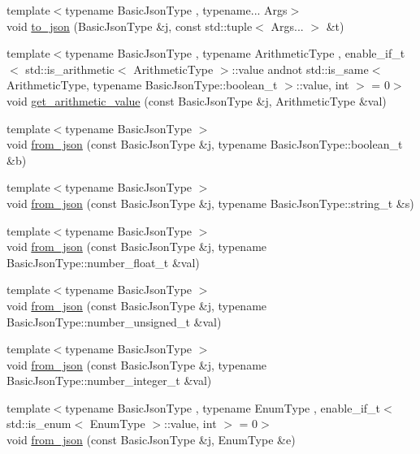 \begin{DoxyCompactItemize}
\item 
{\footnotesize template$<$typename Basic\+Json\+Type , typename... Args$>$ }\\void \hyperlink{namespacenlohmann_1_1detail_aa7a47b08eee864c2c108c04954919648}{to\+\_\+json} (Basic\+Json\+Type \&j, const std\+::tuple$<$ Args... $>$ \&t)
\item 
{\footnotesize template$<$typename Basic\+Json\+Type , typename Arithmetic\+Type , enable\+\_\+if\+\_\+t$<$ std\+::is\+\_\+arithmetic$<$ Arithmetic\+Type $>$\+::value andnot std\+::is\+\_\+same$<$ Arithmetic\+Type, typename Basic\+Json\+Type\+::boolean\+\_\+t $>$\+::value, int $>$  = 0$>$ }\\void \hyperlink{namespacenlohmann_1_1detail_a85955b9c6dd31846e4b8e891f78614b6}{get\+\_\+arithmetic\+\_\+value} (const Basic\+Json\+Type \&j, Arithmetic\+Type \&val)
\item 
{\footnotesize template$<$typename Basic\+Json\+Type $>$ }\\void \hyperlink{namespacenlohmann_1_1detail_a58117f225f43d03e3a0a4a6f3d77c9d9}{from\+\_\+json} (const Basic\+Json\+Type \&j, typename Basic\+Json\+Type\+::boolean\+\_\+t \&b)
\item 
{\footnotesize template$<$typename Basic\+Json\+Type $>$ }\\void \hyperlink{namespacenlohmann_1_1detail_ad74d89f77ada7a57eff38b43d4bf2335}{from\+\_\+json} (const Basic\+Json\+Type \&j, typename Basic\+Json\+Type\+::string\+\_\+t \&s)
\item 
{\footnotesize template$<$typename Basic\+Json\+Type $>$ }\\void \hyperlink{namespacenlohmann_1_1detail_a7cb5dd7d46a60e65f9a8e0873b3f7dd8}{from\+\_\+json} (const Basic\+Json\+Type \&j, typename Basic\+Json\+Type\+::number\+\_\+float\+\_\+t \&val)
\item 
{\footnotesize template$<$typename Basic\+Json\+Type $>$ }\\void \hyperlink{namespacenlohmann_1_1detail_ace4d5680ba413d9fd897ccb5d9c61a1c}{from\+\_\+json} (const Basic\+Json\+Type \&j, typename Basic\+Json\+Type\+::number\+\_\+unsigned\+\_\+t \&val)
\item 
{\footnotesize template$<$typename Basic\+Json\+Type $>$ }\\void \hyperlink{namespacenlohmann_1_1detail_a047d881e611fcac709dc318f730a1732}{from\+\_\+json} (const Basic\+Json\+Type \&j, typename Basic\+Json\+Type\+::number\+\_\+integer\+\_\+t \&val)
\item 
{\footnotesize template$<$typename Basic\+Json\+Type , typename Enum\+Type , enable\+\_\+if\+\_\+t$<$ std\+::is\+\_\+enum$<$ Enum\+Type $>$\+::value, int $>$  = 0$>$ }\\void \hyperlink{namespacenlohmann_1_1detail_a5440d650150d01e8015133521351b459}{from\+\_\+json} (const Basic\+Json\+Type \&j, Enum\+Type \&e)

\end{DoxyCompactItemize}
